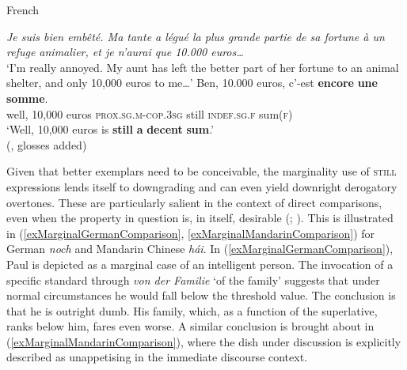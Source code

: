 \begin{exe}
\ex French\label{exMarginalFrenchDecentSum}
	\begin{xlist}
	\textit{Je suis bien embêté. Ma tante a légué la plus grande partie de sa fortune à un refuge animalier, et je n’aurai que 10.000 euros…}\\
	\lq I’m really annoyed. My aunt has left the better part of her fortune to an animal shelter, and only 10,000 euros to me…'
	\gll Ben, 10.000 euros, c'-est \textbf{encore} \textbf{une} \textbf{somme}.\\
	well, 10,000 euros \textsc{prox}.\textsc{sg}.\textsc{m}-\textsc{cop}.3\textsc{sg} still \textsc{indef}.\textsc{sg}.\textsc{f} sum(\textsc{f})\\
	\glt \lq Well, 10,000 euros is \textbf{still} \textbf{a} \textbf{decent} \textbf{sum}.'
	\\(\cite[172]{MosegaardHansen2008}, glosses added)
	\end{xlist}
	\end{exe}

Given that better exemplars need to be conceivable, the marginality use of \textsc{still} expressions lends itself to downgrading and can even yield downright derogatory overtones. These are particularly salient in the context of direct comparisons, even when the property in question is, in itself, desirable (\cite{MosegaardHansen2002}; \cite{Koenig1977}). This is illustrated in (\ref{exMarginalGermanComparison}, \ref{exMarginalMandarinComparison}) for German \textit{noch} and Mandarin Chinese \textit{hái}. In (\ref{exMarginalGermanComparison}), Paul is depicted as a marginal case of an intelligent person. The invocation of a specific standard through \textit{von der Familie} \lq of the family' suggests that under normal circumstances he would fall below the threshold value. The conclusion is that he is outright dumb. His family, which, as a function of the superlative, ranks below him, fares even worse. A similar conclusion is brought about in (\ref{exMarginalMandarinComparison}), where the dish under discussion is explicitly described as unappetising in the immediate discourse context.

